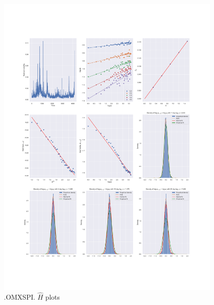 	\begin{figure}[h]
		\centering
		\includegraphics[width=\linewidth]{fig/.OMXSPI.pdf}
		\caption{.OMXSPI. $\hat{H}$ plots}
	\end{figure}

